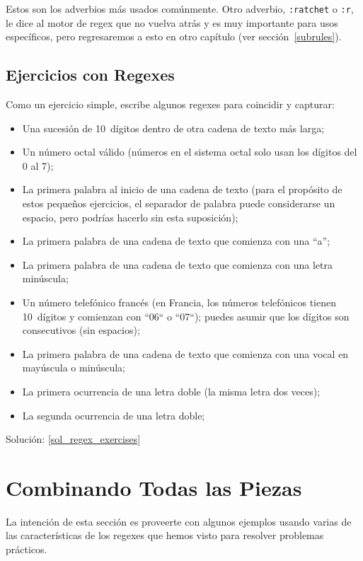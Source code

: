 Estos son los adverbios más usados comúnmente. Otro adverbio,
\verb|:ratchet| o \verb|:r|, le dice al motor de regex que 
no vuelva atrás y es muy importante para usos específicos, 
pero regresaremos a esto en otro capítulo (ver 
sección~\ref{subrules}).

\subsection{Ejercicios con  Regexes}
\label{regex_exercises}

Como un ejercicio simple, escribe algunos regexes para coincidir
y capturar:

\begin{itemize}
\item Una sucesión de 10~dígitos dentro de otra cadena de texto más larga;
\item Un número octal válido (números en el sistema octal solo usan los
dígitos del 0 al 7);
\item La primera palabra al inicio de una cadena de texto (para el 
propósito de estos pequeños ejercicios, el separador de palabra 
puede considerarse un espacio, pero  podrías hacerlo sin esta suposición);
\item La primera palabra de una cadena de texto que comienza con una ``a'';
\item La primera palabra de una cadena de texto que comienza con una letra
minúscula;
\item Un número telefónico francés (en Francia, los números telefónicos
tienen 10~dígitos y comienzan con ``06`` o ``07``); puedes asumir que los
dígitos son consecutivos (sin espacios);
\item La primera palabra de una cadena de texto que comienza con una vocal 
en mayúscula o minúscula; 
\item La primera ocurrencia de una letra doble (la misma letra dos veces);
\item La segunda ocurrencia de una letra doble;
\end{itemize}

Solución: \ref{sol_regex_exercises}
 

\section{Combinando Todas las Piezas}

La intención de esta sección es proveerte con algunos ejemplos 
usando varias de las características de los regexes que hemos
visto para resolver problemas prácticos.

